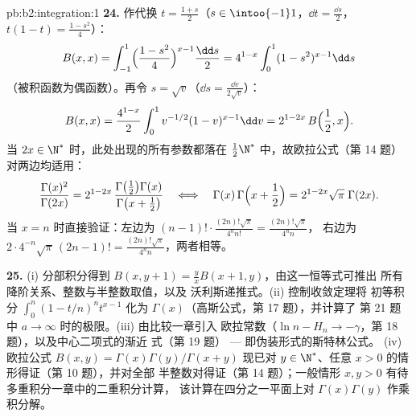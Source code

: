 \begin{solution}{pb:b2:integration:1}
\textbf{24.} 作代换 $t = \frac{1+s}2$（$s \in
\intoo{-1}1$，$\dd t = \frac{\dd s}2$，$t(1-t) =
\frac{1-s^2}4$）：
\[
B(x,x) = \int_{-1}^{1}\Bigl(\frac{1-s^2}{4}\Bigr)^{x-1}
\frac{\dd s}{2}
= 4^{1-x}\int_0^1 (1-s^2)^{x-1}\dd s
\]
（被积函数为偶函数）。再令 $s = \sqrt v$（$\dd s =
\frac{\dd v}{2\sqrt v}$）：
\[
B(x,x) = \frac{4^{1-x}}{2}\int_0^1
v^{-1/2}(1-v)^{x-1}\dd v
= 2^{1-2x}\,B\Bigl(\frac12, x\Bigr) .
\]
当 $2x \in \N^*$ 时，此处出现的所有参数都落在
$\frac12\N^*$ 中，故欧拉公式（第 14 题）
对两边均适用：
\[
\frac{\Gamma(x)^2}{\Gamma(2x)}
= 2^{1-2x}\,
\frac{\Gamma\bigl(\frac12\bigr)\Gamma(x)}
{\Gamma\bigl(x+\frac12\bigr)}
\quad\Longleftrightarrow\quad
\Gamma(x)\,\Gamma\Bigl(x+\frac12\Bigr)
= 2^{1-2x}\sqrt\pi\;\Gamma(2x) .
\]
当 $x = n$ 时直接验证：左边为 $(n-1)!\cdot
\frac{(2n)!\sqrt\pi}{4^n n!} = \frac{(2n)!\sqrt\pi}{4^n n}$，
右边为 $2\cdot4^{-n}\sqrt\pi\,(2n-1)! =
\frac{(2n)!\sqrt\pi}{4^n n}$，两者相等。

\textbf{25.} (i) 分部积分得到 $B(x,y+1) =
\frac yx B(x+1,y)$，由这一恒等式可推出
所有降阶关系、整数与半整数取值，以及
沃利斯递推式。(ii) 控制收敛定理将
初等积分 $\int_0^n(1-t/n)^n t^{x-1}$ 化为
$\Gamma(x)$（高斯公式，第 17 题），并计算了
第 21 题中 $a \to \infty$ 时的极限。(iii) 由比较一章引入
欧拉常数（$\ln n - H_n \to
-\gamma$，第 18 题），以及中心二项式的渐近
式（第 19 题） --- 即伪装形式的斯特林公式。
(iv) 欧拉公式 $B(x,y) = \Gamma(x)\Gamma(y)/\Gamma(x+y)$ 现已对
$y \in \N^*$、任意 $x > 0$ 的情形得证（第 10 题），并对全部
半整数对得证（第 14 题）；一般情形
$x, y > 0$ 有待多重积分一章中的二重积分计算，
该计算在四分之一平面上对
$\Gamma(x)\Gamma(y)$ 作乘积分解。
\end{solution}

